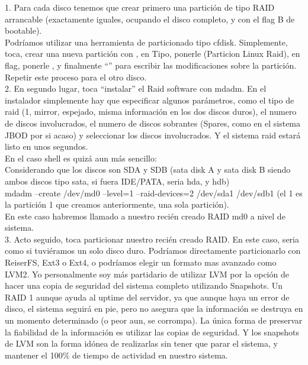 1. Para cada disco tenemos que crear primero una partición de tipo RAID arrancable (exactamente iguales, ocupando el disco completo, y con el flag B de bootable).\\

Podríamos utilizar una herramienta de particionado tipo cfdisk. Simplemente, toca, crear una nueva partición con , en Tipo, ponerle  (Particion Linux Raid), en flag, ponerle , y finalmente “” para escribir las modificaciones sobre la partición. Repetir este proceso para el otro disco. \\

2. En segundo lugar, toca “instalar” el Raid software con mdadm. En el instalador simplemente hay que especificar algunos parámetros, como el tipo de raid (1, mirror, espejado, misma información en los dos discos duros), el numero de discos involucrados, el numero de discos sobrantes (Spares, como en el sistema JBOD por si acaso) y seleccionar los discos involucrados. Y el sistema raid estará listo en unos segundos.\\

En el caso shell es quizá aun más sencillo:\\

Considerando que los discos son SDA y SDB (sata disk A y sata disk B siendo ambos discos tipo sata, si fuera IDE/PATA, seria hda, y hdb)\\

mdadm –create /dev/md0 –level=1 –raid-devices=2 /dev/sda1 /dev/sdb1 (el 1 es la partición 1 que creamos anteriormente, una sola partición).\\

En este caso habremos llamado a nuestro recién creado RAID md0 a nivel de sistema.\\

3. Acto seguido, toca particionar nuestro recién creado RAID. En este caso, seria como si tuviéramos un solo disco duro. Podríamos directamente particionarlo con ReiserFS, Ext3 o Ext4, o podríamos elegir un formato mas avanzado como LVM2. Yo personalmente soy más partidario de utilizar LVM por la opción de hacer una copia de seguridad del sistema completo utilizando Snapshots. Un RAID 1 aunque ayuda al uptime del servidor, ya que aunque haya un error de disco, el sistema seguirá en pie, pero no asegura que la información se destruya en un momento determinado (o peor aun, se corrompa). La única forma de preservar la fiabilidad de la información es utilizar las copias de seguridad. Y los snapshots de LVM son la forma idónea de realizarlas sin tener que parar el sistema, y mantener el 100\% de tiempo de actividad en nuestro sistema.\\

